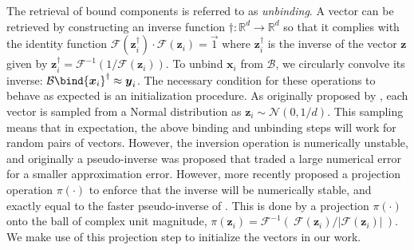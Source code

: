 \documentclass[letterpaper]{article} %
\begin{document}
The retrieval of bound components is referred to as \emph{unbinding}. A vector can be retrieved by constructing an inverse function $\dagger: \mathbb{R}^d \to \mathbb{R}^d$ so that it complies with the identity function $\mathcal{F}(\boldsymbol{z}_{i}^{\dagger}) \cdot \mathcal{F}(\boldsymbol{z}_i) = \vec{1}$ where $\boldsymbol{z}^{\dagger}_i$ is the inverse of the vector $\boldsymbol{z}$ given
by $\boldsymbol{z}^{\dagger}_i = \mathcal{F}^{-1} \left( 1/\mathcal{F}(\boldsymbol{z}_i) \right)$.
To unbind $\boldsymbol{x}_i$ from $\mathcal{B}$, we circularly convolve its inverse: $\mathcal{B} \bind {\boldsymbol{x}_i}^\dagger \approx \boldsymbol{y}_i$. The necessary condition for these operations to behave as expected is an initialization procedure. As originally proposed by \cite{b2}, each vector is sampled from a Normal distribution as $\boldsymbol{z}_i \sim \mathcal{N}(0, 1/d)$. This sampling means that in expectation, the above binding and unbinding steps will work for random pairs of vectors. However, the inversion operation is numerically unstable, and originally a pseudo-inverse was proposed that traded a large numerical error for a smaller approximation error. However, more recently \cite{b3} proposed a projection operation $\pi(\cdot)$ to enforce that the inverse will be numerically stable, and exactly equal to the faster pseudo-inverse of \cite{b2}. This is done by a projection $\pi(\cdot)$ onto the ball of complex unit magnitude, $\pi(\boldsymbol{z}_i) = \mathcal{F}^{-1} \left(\: {\mathcal{F}(\boldsymbol{z}_i)}/{|\mathcal{F}(\boldsymbol{z}_i)|} \:\right)$.
We make use of this projection step to initialize the vectors in our work.
\end{document}
